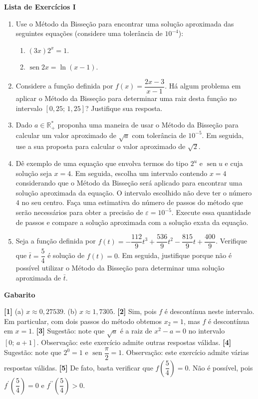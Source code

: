 \documentclass[12pt,a4paper]{article}
\DeclareMathOperator{\sen}{sen}
\begin{document}
\begin{center}
 \textbf{Lista de Exercícios I}
\end{center}

\begin{enumerate}
\item Use o Método da Bisseção para encontrar uma solução aproximada das seguintes equações (considere uma tolerância de $10^{-4}$):
 \begin{enumerate}
  \item $(3x)2^x = 1$. 
  \item $\sen 2x = \ln (x - 1)$.
 \end{enumerate}

 \item Considere a função definida por $f(x) = \dfrac{2x - 3}{x-1}$. Há algum problema em aplicar o Método da Bisseção para determinar uma raiz desta função no intervalo $[0,25;\,1,25]$? Justifique sua resposta.

 \item Dado $a\in\mathbb{R}_+^*$ proponha uma maneira de usar o Método da Bisseção para calcular um valor aproximado de $\sqrt{a}$ com tolerância de $10^{-5}$. Em seguida, use a sua 
proposta para calcular o valor aproximado de $\sqrt{2}$.

 \item Dê exemplo de uma equação que envolva termos do tipo $2^u$ e $\sen u$ e cuja solução seja $x = 4$. Em seguida, escolha um intervalo 
contendo $x = 4$ considerando que o Método da Bisseção será aplicado para encontrar uma solução aproximada da equação. O intervalo escolhido 
não deve ter o número $4$ no seu centro. Faça uma estimativa do número de passos do método que 
serão necessários para obter a precisão de $\varepsilon = 10^{-5}$. Execute essa quantidade de passos e compare a solução 
aproximada com a solução exata da equação.

 \item Seja a função definida por $f(t) =  -\dfrac{112}{9}t^3 + \dfrac{536}{9}t^2 -\dfrac{815}{9}t + \dfrac{400}{9}$. Verifique que $\bar{t} = \dfrac{5}{4}$ é solução de $f(t) = 0$. 
Em seguida, justifique porque não é possível utilizar o Método da Bisseção para determinar uma solução aproximada de $\bar{t}$.

\end{enumerate}

\begin{center}
\textbf{Gabarito}
\end{center}
\textbf{[1]} (a) $x\approx 0,27539$. (b) $x\approx 1,7305$. 
\textbf{[2]} Sim, pois $f$ é descontínua neste intervalo. Em particular, com dois passos do método obtemos $x_2 = 1$, mas $f$ é descontínua em $x = 1$. 
\textbf{[3]} Sugestão: note que $\sqrt{a}$ é a raiz de $x^2 - a = 0$ no intervalo $[0;\,a+1]$. Observação: este exercício admite outras respostas válidas. 
\textbf{[4]} Sugestão: note que $2^0 = 1$ e $\sen\dfrac{\pi}{2} = 1$. Observação: este exercício admite várias respostas válidas.
\textbf{[5]} De fato, basta verificar que $f\left(\dfrac{5}{4}\right) = 0$. Não é possível, pois $f^\prime\left(\dfrac{5}{4}\right) = 0$ e 
$f^{\prime\prime}\left(\dfrac{5}{4}\right) > 0$.
\end{document}
